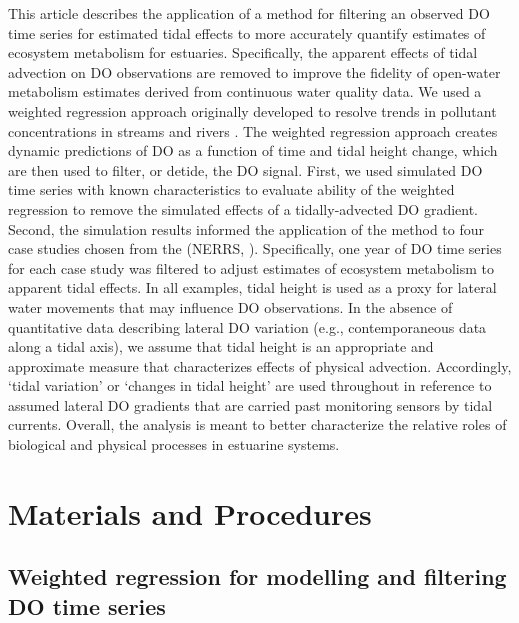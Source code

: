 \documentclass[letterpaper,12pt,oneside]{article}\usepackage[]{graphicx}\usepackage[]{color}
\begin{document}
This article describes the application of a method for filtering an observed \ac{DO} time series for estimated tidal effects to more accurately quantify estimates of ecosystem metabolism for estuaries.  Specifically, the apparent effects of tidal advection on \ac{DO} observations are removed to improve the fidelity of open-water metabolism estimates derived from continuous water quality data.  We used a weighted regression approach originally developed to resolve trends in pollutant concentrations in streams and rivers \citep{Hirsch10}.  The weighted regression approach creates dynamic predictions of \ac{DO} as a function of time and tidal height change, which are then used to filter, or detide, the \ac{DO} signal.  First, we used simulated \ac{DO} time series with known characteristics to evaluate ability of the weighted regression to remove the simulated effects of a tidally-advected \ac{DO} gradient.  Second, the simulation results informed the application of the method to four case studies chosen from the  (\acs{NERRS}, \citealt{Wenner04}).  Specifically, one year of \ac{DO} time series for each case study was filtered to adjust estimates of ecosystem metabolism to apparent tidal effects.  In all examples, tidal height is used as a proxy for lateral water movements that may influence \ac{DO} observations.  In the absence of quantitative data describing lateral \ac{DO} variation (e.g., contemporaneous data along a tidal axis), we assume that tidal height is an appropriate and approximate measure that characterizes effects of physical advection.  Accordingly, `tidal variation' or `changes in tidal height' are used throughout in reference to assumed lateral \ac{DO} gradients that are carried past monitoring sensors by tidal currents.  Overall, the analysis is meant to better characterize the relative roles of biological and physical processes in estuarine systems.

\section{Materials and Procedures}

\subsection{Weighted regression for modelling and filtering \ac{DO} time series}
\end{document}
